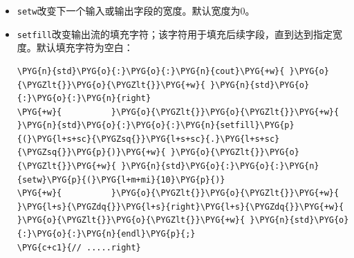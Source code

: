\begin{itemize}
\begin{codeblockbg}
\begin{Verbatim}[commandchars=\\\{\},breaklines=true,breakanywhere=true,fontsize=\codefont,xleftmargin=17bp]
\PYG{n}{std}\PYG{o}{:}\PYG{o}{:}\PYG{n}{cout}\PYG{+w}{ }\PYG{o}{\PYGZlt{}}\PYG{o}{\PYGZlt{}}\PYG{+w}{ }\PYG{n}{std}\PYG{o}{:}\PYG{o}{:}\PYG{n}{oct}\PYG{+w}{ }\PYG{o}{\PYGZlt{}}\PYG{o}{\PYGZlt{}}\PYG{+w}{ }\PYG{l+m+mi}{42}\PYG{+w}{ }\PYG{o}{\PYGZlt{}}\PYG{o}{\PYGZlt{}}\PYG{+w}{ }\PYG{n}{std}\PYG{o}{:}\PYG{o}{:}\PYG{n}{endl}\PYG{p}{;}\PYG{+w}{ }\PYG{c+c1}{// 52}
\PYG{n}{std}\PYG{o}{:}\PYG{o}{:}\PYG{n}{cout}\PYG{+w}{ }\PYG{o}{\PYGZlt{}}\PYG{o}{\PYGZlt{}}\PYG{+w}{ }\PYG{n}{std}\PYG{o}{:}\PYG{o}{:}\PYG{n}{hex}\PYG{+w}{ }\PYG{o}{\PYGZlt{}}\PYG{o}{\PYGZlt{}}\PYG{+w}{ }\PYG{l+m+mi}{42}\PYG{+w}{ }\PYG{o}{\PYGZlt{}}\PYG{o}{\PYGZlt{}}\PYG{+w}{ }\PYG{n}{std}\PYG{o}{:}\PYG{o}{:}\PYG{n}{endl}\PYG{p}{;}\PYG{+w}{ }\PYG{c+c1}{// 2a}
\PYG{n}{std}\PYG{o}{:}\PYG{o}{:}\PYG{n}{cout}\PYG{+w}{ }\PYG{o}{\PYGZlt{}}\PYG{o}{\PYGZlt{}}\PYG{+w}{ }\PYG{n}{std}\PYG{o}{:}\PYG{o}{:}\PYG{n}{dec}\PYG{+w}{ }\PYG{o}{\PYGZlt{}}\PYG{o}{\PYGZlt{}}\PYG{+w}{ }\PYG{l+m+mi}{42}\PYG{+w}{ }\PYG{o}{\PYGZlt{}}\PYG{o}{\PYGZlt{}}\PYG{+w}{ }\PYG{n}{std}\PYG{o}{:}\PYG{o}{:}\PYG{n}{endl}\PYG{p}{;}\PYG{+w}{ }\PYG{c+c1}{// 42}
\end{Verbatim}
\end{codeblockbg}



\item \texttt{setw}改变下一个输入或输出字段的宽度。默认宽度为0。



\item \texttt{setfill}改变输出流的填充字符；该字符用于填充后续字段，直到达到指定宽度。默认填充字符为空白：



\begin{codeblockbg}
\begin{Verbatim}[commandchars=\\\{\},breaklines=true,breakanywhere=true,fontsize=\codefont,xleftmargin=17bp]
\PYG{n}{std}\PYG{o}{:}\PYG{o}{:}\PYG{n}{cout}\PYG{+w}{ }\PYG{o}{\PYGZlt{}}\PYG{o}{\PYGZlt{}}\PYG{+w}{ }\PYG{n}{std}\PYG{o}{:}\PYG{o}{:}\PYG{n}{right}
\PYG{+w}{          }\PYG{o}{\PYGZlt{}}\PYG{o}{\PYGZlt{}}\PYG{+w}{ }\PYG{n}{std}\PYG{o}{:}\PYG{o}{:}\PYG{n}{setfill}\PYG{p}{(}\PYG{l+s+sc}{\PYGZsq{}}\PYG{l+s+sc}{.}\PYG{l+s+sc}{\PYGZsq{}}\PYG{p}{)}\PYG{+w}{ }\PYG{o}{\PYGZlt{}}\PYG{o}{\PYGZlt{}}\PYG{+w}{ }\PYG{n}{std}\PYG{o}{:}\PYG{o}{:}\PYG{n}{setw}\PYG{p}{(}\PYG{l+m+mi}{10}\PYG{p}{)}
\PYG{+w}{          }\PYG{o}{\PYGZlt{}}\PYG{o}{\PYGZlt{}}\PYG{+w}{ }\PYG{l+s}{\PYGZdq{}}\PYG{l+s}{right}\PYG{l+s}{\PYGZdq{}}\PYG{+w}{ }\PYG{o}{\PYGZlt{}}\PYG{o}{\PYGZlt{}}\PYG{+w}{ }\PYG{n}{std}\PYG{o}{:}\PYG{o}{:}\PYG{n}{endl}\PYG{p}{;}
\PYG{c+c1}{// .....right}
\end{Verbatim}
\end{codeblockbg}



\end{itemize}
